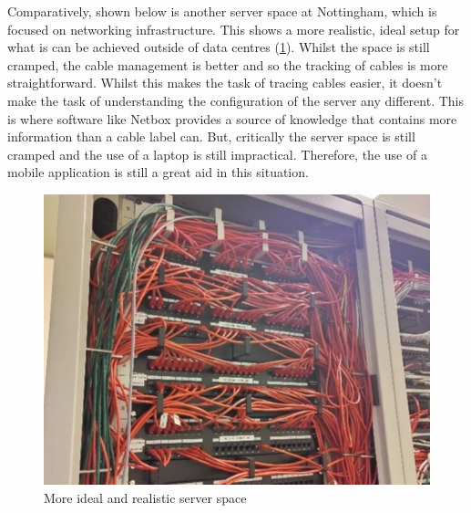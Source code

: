 \documentclass [11pt,a4paper]{article}
\begin{document}
Comparatively, shown below is another server space at Nottingham, which is focused on networking infrastructure. This shows a more realistic, ideal setup for what is can be achieved outside of data centres (\ref{fig:ideal_server_space}). Whilst the space is still cramped, the cable management is better and so the tracking of cables is more straightforward. Whilst this makes the task of tracing cables easier, it doesn't make the task of understanding the configuration of the server any different. This is where software like Netbox provides a source of knowledge that contains more information than a cable label can. But, critically the server space is still cramped and the use of a laptop is still impractical. Therefore, the use of a mobile application is still a great aid in this situation.

\begin{figure}[H]
    \centering
    \includegraphics[width=0.36\linewidth]{images/server_racks_clean.jpg}
    \caption{More ideal and realistic server space\cite{ideal_server_pic}}
    \label{fig:ideal_server_space}
\end{figure}
\end{document}
